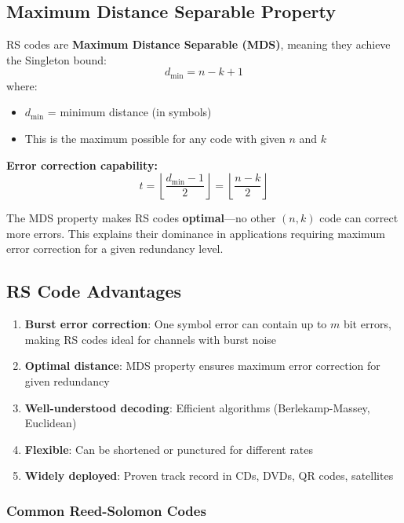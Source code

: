 \subsection{Maximum Distance Separable Property}

RS codes are \textbf{Maximum Distance Separable (MDS)}, meaning they achieve the Singleton bound:
\begin{equation}
d_{\min} = n - k + 1
\end{equation}
where:
\begin{itemize}
\item $d_{\min}$ = minimum distance (in symbols)
\item This is the maximum possible for any code with given $n$ and $k$
\end{itemize}

\textbf{Error correction capability:}
\begin{equation}
t = \left\lfloor \frac{d_{\min} - 1}{2} \right\rfloor = \left\lfloor \frac{n-k}{2} \right\rfloor
\end{equation}

\begin{keyconcept}
The MDS property makes RS codes \textbf{optimal}---no other $(n,k)$ code can correct more errors. This explains their dominance in applications requiring maximum error correction for a given redundancy level.
\end{keyconcept}

\subsection{RS Code Advantages}

\begin{enumerate}
\item \textbf{Burst error correction}: One symbol error can contain up to $m$ bit errors, making RS codes ideal for channels with burst noise
\item \textbf{Optimal distance}: MDS property ensures maximum error correction for given redundancy
\item \textbf{Well-understood decoding}: Efficient algorithms (Berlekamp-Massey, Euclidean)
\item \textbf{Flexible}: Can be shortened or punctured for different rates
\item \textbf{Widely deployed}: Proven track record in CDs, DVDs, QR codes, satellites
\end{enumerate}

\subsubsection{Common Reed-Solomon
Codes}\label{common-reed-solomon-codes}

